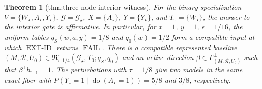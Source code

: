 \documentclass{article}
\newtheorem{theorem}{Theorem}
\begin{document}
\begin{theorem}[thm:three-node-interior-witness]\label{thm:three-node-interior-witness}
For the binary specialization \(V=\{W_\star,A_\star,Y_\star\}\), \(\mathcal G=\mathcal G_\star\), \(X=\{A_\star\}\), \(Y=\{Y_\star\}\), and \(T_0=\{W_\star\}\), the answer to the interior gate is affirmative.  In particular, for \(x=1\), \(y=1\), \(\epsilon=1/16\), the uniform tables \(q_S(w,a,y)=1/8\) and \(q_0(w)=1/2\) form a compatible input at which \(\operatorname{EXT\text{-}ID}\) returns \(\operatorname{FAIL}\).  There is a compatible represented baseline \((M,\mathcal R,U_0)\in\mathfrak R_{\epsilon,1/4}^{\circ}(\mathcal G_\star,T_0;q_S,q_0)\) and an active direction \(\beta\in\Gamma_{(M,\mathcal R,U_0)}^\perp\) such that \(\beta^{\mathsf T}h_{1,1}=1\).  The perturbations with \(\tau=1/8\) give two models in the same exact fiber with \(P(Y_\star=1\mid\operatorname{do}(A_\star=1))=5/8\) and \(3/8\), respectively.
\end{theorem}
\end{document}
